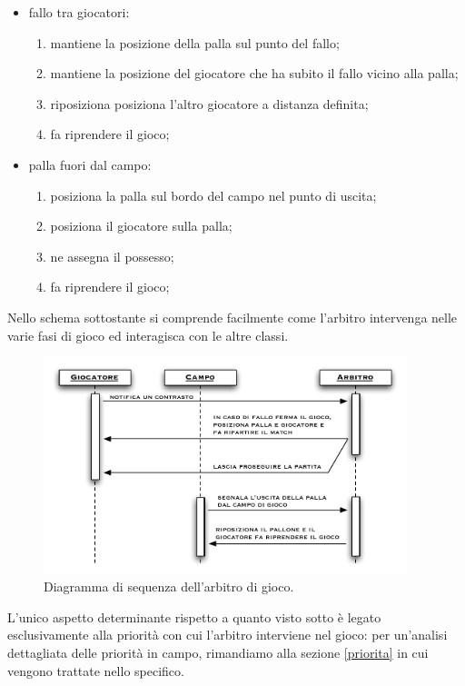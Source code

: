 \documentclass[aps,letterpaper,10pt]{article}
\begin{document}
\begin{itemize}
	\item fallo tra giocatori:
	\begin{enumerate}
		\item mantiene la posizione della palla sul punto del fallo;
		\item mantiene la posizione del giocatore che ha subito il fallo vicino alla palla;
		\item riposiziona posiziona l'altro giocatore a distanza definita;
		\item fa riprendere il gioco;
	\end{enumerate}
	\item palla fuori dal campo:
	\begin{enumerate}
		\item posiziona la palla sul bordo del campo nel punto di uscita;
		\item posiziona il giocatore sulla palla;
		\item ne assegna il possesso;
		\item fa riprendere il gioco;
	\end{enumerate}
\end{itemize}

Nello schema sottostante si comprende facilmente come l'arbitro intervenga nelle varie fasi di gioco ed interagisca con le altre classi.

\begin{figure}[H]
	\begin{center}
		\includegraphics[width=400px]{images/referee-sequence.pdf}
	\end{center}
\caption{Diagramma di sequenza dell'arbitro di gioco.}
\end{figure}

L'unico aspetto determinante rispetto a quanto visto sotto \`e legato esclusivamente alla priorit\`a con cui l'arbitro interviene nel gioco: per un'analisi dettagliata delle priorit\`a in campo, rimandiamo alla sezione \ref{priorita} in cui vengono trattate nello specifico.
\end{document}

